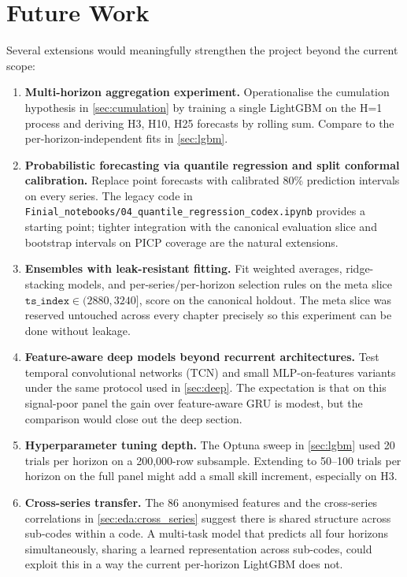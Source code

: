 \section{Future Work}
\label{sec:future_work}

Several extensions would meaningfully strengthen the project beyond the current scope:

\begin{enumerate}
  \item \textbf{Multi-horizon aggregation experiment.} Operationalise the cumulation hypothesis in \cref{sec:cumulation} by training a single LightGBM on the H=1 process and deriving H3, H10, H25 forecasts by rolling sum. Compare to the per-horizon-independent fits in \cref{sec:lgbm}.
  \item \textbf{Probabilistic forecasting via quantile regression and split conformal calibration.} Replace point forecasts with calibrated 80\% prediction intervals on every series. The legacy code in \texttt{Finial\_notebooks/04\_quantile\_regression\_codex.ipynb} provides a starting point; tighter integration with the canonical evaluation slice and bootstrap intervals on PICP coverage are the natural extensions.
  \item \textbf{Ensembles with leak-resistant fitting.} Fit weighted averages, ridge-stacking models, and per-series/per-horizon selection rules on the meta slice $\mathtt{ts\_index} \in (2880, 3240]$, score on the canonical holdout. The meta slice was reserved untouched across every chapter precisely so this experiment can be done without leakage.
  \item \textbf{Feature-aware deep models beyond recurrent architectures.} Test temporal convolutional networks (TCN) and small MLP-on-features variants under the same protocol used in \cref{sec:deep}. The expectation is that on this signal-poor panel the gain over feature-aware GRU is modest, but the comparison would close out the deep section.
  \item \textbf{Hyperparameter tuning depth.} The Optuna sweep in \cref{sec:lgbm} used 20 trials per horizon on a 200{,}000-row subsample. Extending to 50--100 trials per horizon on the full panel might add a small skill increment, especially on H3.
  \item \textbf{Cross-series transfer.} The 86 anonymised features and the cross-series correlations in \cref{sec:eda:cross_series} suggest there is shared structure across sub-codes within a code. A multi-task model that predicts all four horizons simultaneously, sharing a learned representation across sub-codes, could exploit this in a way the current per-horizon LightGBM does not.
\end{enumerate}
